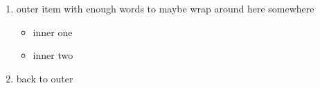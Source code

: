 \begin{enumerate}
  \item outer item with enough words to maybe wrap
        around here somewhere
        \begin{itemize}
          \item inner one
          \item inner two
        \end{itemize}
  \item back to outer
\end{enumerate}
